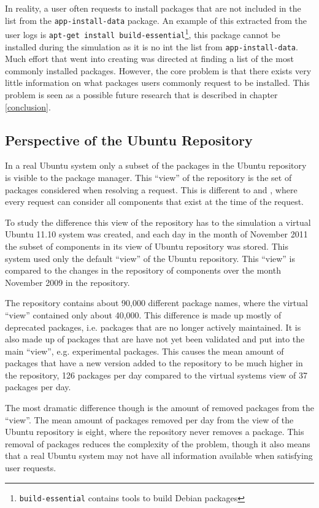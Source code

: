 In reality, a user often requests to install packages that are not included in the list from the \texttt{app-install-data} package. 
An example of this extracted from the user logs is \texttt{apt-get install build-essential}\footnote{\texttt{build-essential} contains tools to build Debian packages},
this package cannot be installed during the simulation as it is no int the list from  \texttt{app-install-data}.
Much effort that went into creating \usermodel was directed at finding a list of the most commonly installed packages.
However, the core problem is that there exists very little information on what packages users commonly request to be installed.
This problem is seen as a possible future research that is described in chapter \ref{conclusion}. 

\subsection{Perspective of the Ubuntu Repository}
In a real Ubuntu system only a subset of the packages in the Ubuntu repository is visible to the package manager.
This ``view'' of the repository is the set of packages considered when resolving a request.
This is different to \modelname and \usermodel, 
where every request can consider all components that exist at the time of the request. 

To study the difference this view of the repository has to the simulation a virtual Ubuntu 11.10 system was created, 
and each day in the month of November 2011 the subset of components in its view of Ubuntu repository was stored.
This system used only the default ``view'' of the Ubuntu repository.
This ``view'' is compared to the changes in the repository of components over the month November 2009 in the \usermodel repository.

The \usermodel repository contains about 90,000 different package names, where the virtual ``view'' contained only about 40,000.
This difference is made up mostly of deprecated packages, i.e. packages that are no longer actively maintained.
It is also made up of packages that are have not yet been validated and put into the main ``view'', e.g. experimental packages. 
This causes the mean amount of packages that have a new version added to the repository to be much higher in the \usermodel repository,
126 packages per day compared to the virtual systems view of 37 packages per day.

The most dramatic difference though is the amount of removed packages from the ``view''.
The mean amount of packages removed per day from the view of the Ubuntu repository is eight, where the \usermodel repository never removes a package.
This removal of packages reduces the complexity of the problem, 
though it also means that a real Ubuntu system may not have all information available when satisfying user requests. 

